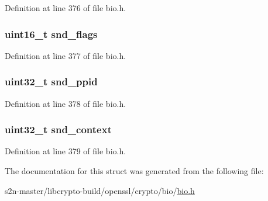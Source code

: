 Definition at line 376 of file bio.\+h.

\subsubsection[{\texorpdfstring{snd\+\_\+flags}{snd_flags}}]{\setlength{\rightskip}{0pt plus 5cm}uint16\+\_\+t snd\+\_\+flags}\hypertarget{structbio__dgram__sctp__sndinfo_a6b2033563132c7307da08930d1f9b523}{}\label{structbio__dgram__sctp__sndinfo_a6b2033563132c7307da08930d1f9b523}


Definition at line 377 of file bio.\+h.

\subsubsection[{\texorpdfstring{snd\+\_\+ppid}{snd_ppid}}]{\setlength{\rightskip}{0pt plus 5cm}uint32\+\_\+t snd\+\_\+ppid}\hypertarget{structbio__dgram__sctp__sndinfo_a4dd98b36aa77d80206518a0241368f24}{}\label{structbio__dgram__sctp__sndinfo_a4dd98b36aa77d80206518a0241368f24}


Definition at line 378 of file bio.\+h.

\subsubsection[{\texorpdfstring{snd\+\_\+context}{snd_context}}]{\setlength{\rightskip}{0pt plus 5cm}uint32\+\_\+t snd\+\_\+context}\hypertarget{structbio__dgram__sctp__sndinfo_a17163f1e8402428a51e080b38bf25467}{}\label{structbio__dgram__sctp__sndinfo_a17163f1e8402428a51e080b38bf25467}


Definition at line 379 of file bio.\+h.



The documentation for this struct was generated from the following file\+:\begin{DoxyCompactItemize}
\item 
s2n-\/master/libcrypto-\/build/openssl/crypto/bio/\hyperlink{crypto_2bio_2bio_8h}{bio.\+h}\end{DoxyCompactItemize}
